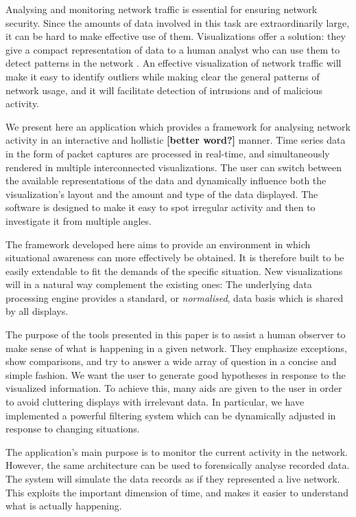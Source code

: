 Analysing and monitoring network traffic is essential for ensuring network security. Since the amounts of data involved in this task are extraordinarily large, it can be hard to make effective use of them. Visualizations offer a solution: they give a compact representation of data to a human analyst who can use them to detect patterns in the network \cite{ware2012information}. An effective visualization of network traffic will make it easy to identify outliers while making clear the general patterns of network usage, and it will facilitate detection of intrusions and of malicious activity. 

We present here an application which provides a framework for analysing network activity in an interactive and hollistic \textbf{[better word?]} manner. Time series data in the form of packet captures are processed in real-time, and simultaneously rendered in multiple interconnected visualizations. The user can switch between the available representations of the data and dynamically influence both the visualization's layout and the amount and type of the data displayed. The software is designed to make it easy to spot irregular activity and then to investigate it from multiple angles. 

The framework developed here aims to provide an environment in which situational awareness can more effectively be obtained. It is therefore built to be easily extendable to fit the demands of the specific situation. New visualizations will in a natural way complement the existing ones: The underlying data processing engine provides a standard, or \textit{normalised}, data basis which is shared by all displays.

The purpose of the tools presented in this paper is to assist a human observer to make sense of what is happening in a given network. They emphasize exceptions, show comparisons, and try to answer a wide array of question in a concise and simple fashion. We want the user to generate good hypotheses in response to the visualized information. To achieve this, many aids are given to the user in order to avoid cluttering displays with irrelevant data. In particular, we have implemented a powerful filtering system which can be dynamically adjusted in response to changing situations.

The application's main purpose is to monitor the current activity in the network. However, the same architecture can be used to forensically analyse recorded data. The system will simulate the data records as if they represented a live network. This exploits the important dimension of time, and makes it easier to understand what is actually happening.
